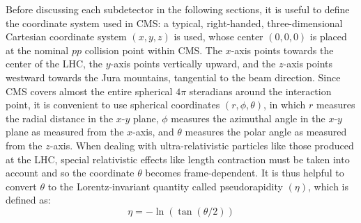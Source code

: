 Before discussing each subdetector in the following sections, it is useful to define the coordinate system used in CMS:
a typical, right-handed, three-dimensional Cartesian coordinate system $(x, y, z)$ is used, whose center $(0, 0, 0)$ is placed at the nominal $pp$ collision point within CMS.
The $x$-axis points towards the center of the LHC, the $y$-axis points vertically upward, and the $z$-axis points westward towards the Jura mountains, tangential to the beam direction.
Since CMS covers almost the entire spherical $4\pi$ steradians around the interaction point, it is convenient to use spherical coordinates $(r, \phi, \theta)$,
in which $r$ measures the radial distance in the $x$-$y$ plane, $\phi$ measures the azimuthal angle in the $x$-$y$ plane as measured from the $x$-axis, and $\theta$ measures the polar angle as measured from the $z$-axis.
When dealing with ultra-relativistic particles like those produced at the LHC, special relativistic effects like length contraction must be taken into account and so the coordinate $\theta$ becomes frame-dependent.
It is thus helpful to convert $\theta$ to  the Lorentz-invariant quantity called pseudorapidity $(\eta)$, which is defined as:
\begin{equation*}
    \eta = -\ln \left(
        \tan (\theta / 2)
        \right)
\end{equation*}
